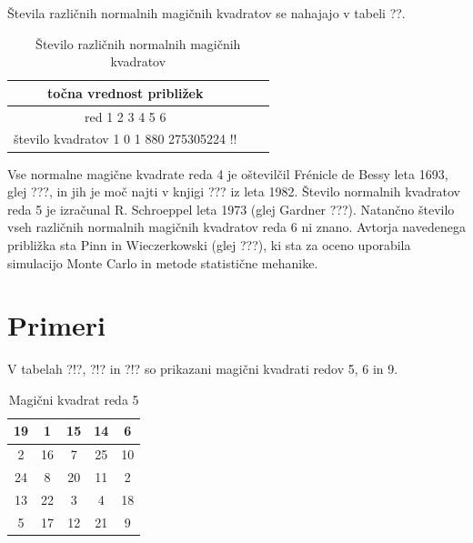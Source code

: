 \documentclass[a4paper,12pt]{article}
\begin{document}
Števila različnih normalnih magičnih kvadratov se nahajajo v tabeli ??.

\begin{table}[h!]
   \centering
   \caption{Število različnih normalnih magičnih kvadratov}
   \label{table:stevila}
   \begin{tabular}{|c|c|c|}
   \hline
      točna vrednost približek \\\hline
      red 1 2 3 4 5 6 \\\hline
      število kvadratov 1 0 1 880 275305224 !! \\\hline
   \end{tabular}
\end{table}

Vse normalne magične kvadrate reda 4 je oštevilčil Frénicle de Bessy
leta 1693, glej ???, in jih je moč najti v knjigi ???
iz leta 1982. Število normalnih kvadratov reda 5 je izračunal
R. Schroeppel leta 1973 (glej Gardner ???).
Natančno število vseh različnih normalnih magičnih kvadratov reda 6 ni znano.
Avtorja navedenega približka sta Pinn in Wieczerkowski (glej ???), ki
sta za oceno uporabila simulacijo Monte Carlo in metode statistične mehanike.


\section{Primeri}

V tabelah ?!?, ?!? in ?!? so prikazani
magični kvadrati redov 5, 6 in 9.

\begin{table}[h!]
   \centering
   \caption{Magični kvadrat reda 5}
   \label{table:mag5}
   \begin{tabular}{|c|c|c|c|c|}
      \hline
   19 &  1 & 15 & 14 &  6 \\\hline
    2 & 16 &  7 & 25 & 10 \\\hline
   24 &  8 & 20 & 11 &  2 \\\hline
   13 & 22 &  3 &  4 & 18 \\\hline
    5 & 17 & 12 & 21 & 9 \\\hline
\end{tabular}
\end{table}
\end{document}
